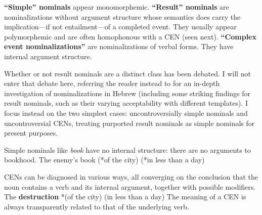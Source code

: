 \pex
	\a \textbf{``Simple'' nominals} appear monomorphemic.
	\a \textbf{``Result'' nominals} are nominalizations without argument structure whose semantics does carry the implication---if not entailment---of a completed event. They usually appear polymorphemic and are often homophonous with a CEN (seen next).
	\a \textbf{``Complex event nominalizations''} are nominalizations of verbal forms. They have internal argument structure.
\xe

Whether or not result nominals are a distinct class has been debated. I will not enter that debate here, referring the reader instead to \cite{ahdout19glow,ahdout19phd} for an in-depth investigation of nominalizations in Hebrew (including some striking findings for result nominals, such as their varying acceptability with different templates). I focus instead on the two simplest cases: uncontroversially simple nominals and uncontroversial CENs, treating purported result nominals as simple nominals for present purposes.

Simple nominals like \emph{book }have no internal structure: there are no arguments to bookhood.
\ex \ljudge{*} The enemy's book (*of the city) (*in less than a day)
\xe	

CENs can be diagnosed in various ways, all converging on the conclusion that the noun contains a verb and its internal argument, together with possible modifiers.
\ex The \textbf{destruction} *(of the city) (in less than a day)
\xe
The meaning of a CEN is always transparently related to that of the underlying verb.

